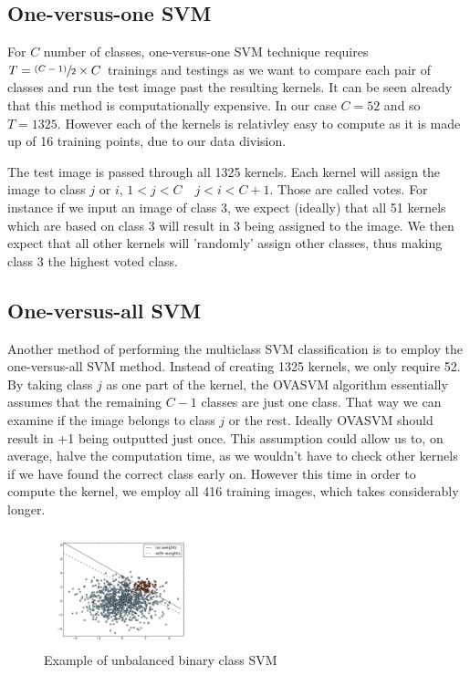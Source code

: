 \documentclass[10pt,twocolumn,letterpaper]{article}
\begin{document}
\subsection{One-versus-one SVM}
For $C$ number of classes, one-versus-one SVM technique requires $T = \sfrac{(C-1)}{2}\times C$ trainings and testings as we want to compare each pair of classes and run the test image past the resulting kernels. It can be seen already that this method is computationally expensive. In our case $C=52$ and so $T = 1325$. However each of the kernels is relativley easy to compute as it is made up of 16 training points, due to our data division.

The test image is passed through all 1325 kernels. Each kernel will assign the image to class $j$ or $i$, $1<j<C \quad j<i<C+1$. Those are called votes. For instance if we input an image of class 3, we expect (ideally) that all 51 kernels which are based on class 3 will result  in $3$ being assigned to the image. We then expect that all other kernels will 'randomly' assign other classes, thus making class 3 the highest voted class.
 
\subsection{One-versus-all SVM}
Another method of performing the multiclass SVM classification is to employ the one-versus-all SVM method. Instead of creating 1325 kernels, we only require 52. By taking class $j$ as one part of the kernel, the OVASVM algorithm essentially assumes that the remaining $C-1$ classes are just one class. That way we can examine if the image belongs to class $j$ or the rest. Ideally OVASVM should result in +1 being outputted just once. This assumption could allow us to, on average, halve the computation time, as we wouldn't have to check other kernels if we have found the correct class early on. However this time in order to compute the kernel, we employ all 416 training images, which takes considerably longer.

\begin{figure}[H]
\begin{center}
  
    \includegraphics[width=0.4\textwidth]{../results/SVM_unbalanced}

  \caption{Example of unbalanced binary class SVM \cite{SVM_unb}} \label{fig:SVM_un}
\end{center}
\end{figure}
\end{document}
